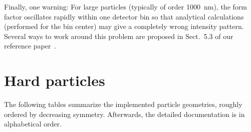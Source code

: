 %
%
%
%
%
Finally, one warning: For large particles (typically of order 1000~nm),
  the form factor oscillates rapidly within one detector bin
  so that analytical calculations (performed for the bin center)
  may give a completely wrong intensity pattern.
Several ways to work around this problem are proposed in Sect.~5.3
of our reference paper~\cite{PoHB20}.

\chapter{Hard particles}\label{SHPFF}

The following tables summarize the implemented particle geometries,
 roughly ordered by decreasing symmetry.
Afterwards, the detailed documentation is in alphabetical order.

